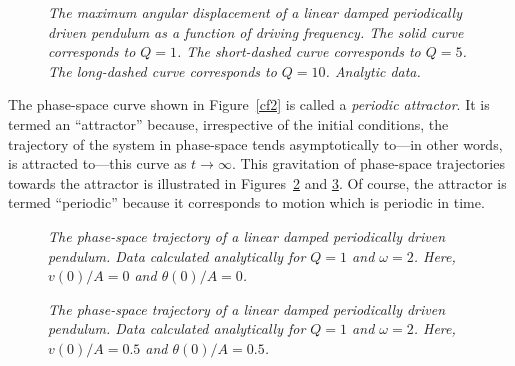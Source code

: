 \begin{figure}
\epsfysize=2.5in
\centerline{}
\caption{\em The maximum angular displacement of a linear damped periodically driven 
pendulum as a function of driving frequency. The solid curve corresponds to $Q=1$. The
short-dashed curve corresponds to $Q=5$. The long-dashed curve corresponds to $Q=10$.
Analytic data.}\label{cf3}
\end{figure}

The phase-space curve shown in Figure~\ref{cf2} is called a {\em periodic attractor}. It is 
termed an ``attractor'' because,
irrespective of the initial conditions, the trajectory of the system in phase-space tends
asymptotically to---in other words, is attracted to---this curve as $t\rightarrow\infty$. This
gravitation of phase-space trajectories towards the attractor is illustrated in Figures~\ref{cf4} and
\ref{cf5}. Of course, the attractor is termed ``periodic'' because it corresponds to motion which is
periodic in time.

\begin{figure}
\epsfysize=2.5in
\centerline{}
\caption{\em The phase-space trajectory of a linear damped  periodically driven
pendulum. Data calculated analytically for $Q=1$ and $\omega=2$. Here, $v(0)/A=0$ and $\theta(0)/A=0$.
}\label{cf4}
\end{figure}
\begin{figure}
\epsfysize=2.5in
\centerline{}
\caption{\em The phase-space trajectory of a linear damped periodically driven
pendulum. Data calculated analytically for $Q=1$ and $\omega=2$.
Here, $v(0)/A=0.5$ and $\theta(0)/A=0.5$. }\label{cf5}
\end{figure}

